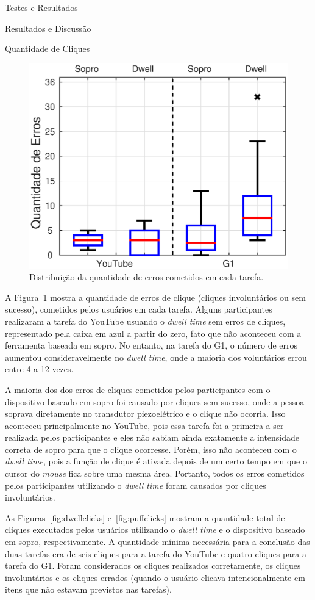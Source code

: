 \begin{chapter}{Testes e Resultados}
\begin{section}{Resultados e Discussão}
\begin{subsection}{Quantidade de Cliques}
\begin{figure}[!b]
	\centering
	\includegraphics[width=.65\linewidth]{fig/erros}
	\caption{Distribuição da quantidade de erros cometidos em cada tarefa.}
	\label{fig:cliques}
\end{figure}
A Figura~\ref{fig:cliques} mostra a quantidade de erros de clique (cliques
involuntários ou sem sucesso), cometidos pelos usuários em cada tarefa. Alguns
participantes realizaram a tarefa do YouTube usuando o \textit{dwell time} sem
erros de cliques, representado pela caixa em azul a partir do zero, fato que não
aconteceu com a ferramenta baseada em sopro. No entanto, na tarefa do G1, o
número de erros aumentou consideravelmente no \textit{dwell time}, onde a
maioria dos voluntários errou entre 4 a 12 vezes.


A maioria dos dos erros de cliques cometidos pelos participantes com o
dispositivo baseado em sopro foi causado por cliques sem sucesso, onde a pessoa
soprava diretamente no transdutor piezoelétrico e o clique não ocorria. Isso
aconteceu principalmente no YouTube, pois essa tarefa foi a primeira a ser
realizada pelos participantes e eles não sabiam ainda exatamente a intensidade
correta de sopro para que o clique ocorresse. Porém, isso não aconteceu com o
\textit{dwell time}, pois a função de clique é ativada depois de um certo
tempo em que o cursor do \textit{mouse} fica sobre uma mesma área. Portanto,
todos os erros cometidos pelos participantes utilizando o \textit{dwell time}
foram causados por cliques involuntários.

As Figuras~\ref{fig:dwellclicks} e~\ref{fig:puffclicks} mostram a quantidade
total de cliques executados pelos usuários utilizando o \textit{dwell time} e o
dispositivo baseado em sopro, respectivamente. A quantidade mínima necessária
para a conclusão das duas tarefas era de seis cliques para a tarefa do YouTube e
quatro cliques para a tarefa do G1. Foram considerados os cliques
realizados corretamente, os cliques involuntários e os
cliques errados (quando o usuário clicava intencionalmente em itens que não
estavam previstos nas tarefas).


\end{subsection}
\end{section}
\end{chapter}
